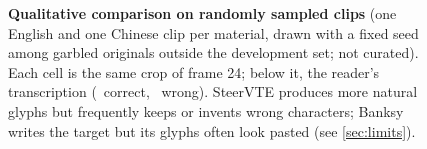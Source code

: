 \begin{figure}[t]
\begin{tabular}{@{}m{0.95cm}cccccc@{}}
\end{tabular}
\caption{\textbf{Qualitative comparison on randomly sampled clips} (one English and one Chinese clip per material, drawn with a fixed seed among garbled originals outside the development set; not curated). Each cell is the same crop of frame 24; below it, the reader's transcription (\textcolor{okgreen}{}~correct, \textcolor{badred}{}~wrong). SteerVTE produces more natural glyphs but frequently keeps or invents wrong characters; Banksy writes the target but its glyphs often look pasted (see \cref{sec:limits}).}
\label{fig:qual}
\end{figure}
